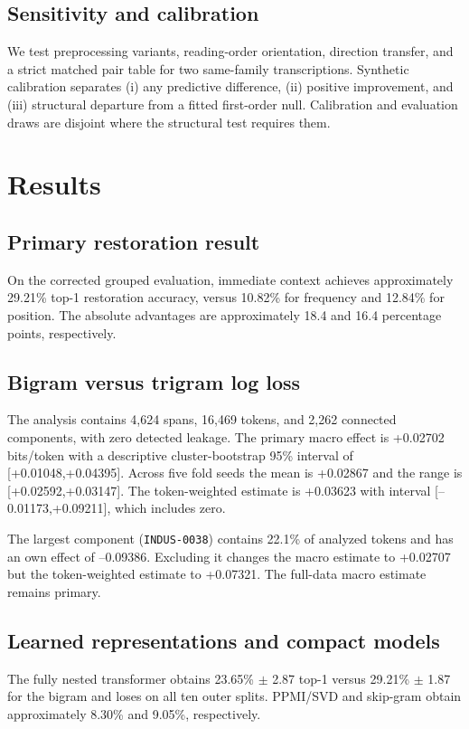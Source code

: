 \documentclass[11pt]{article}
\begin{document}
\subsection{Sensitivity and calibration}
We test preprocessing variants, reading-order orientation, direction transfer, and a strict matched pair table for two same-family transcriptions. Synthetic calibration separates (i) any predictive difference, (ii) positive improvement, and (iii) structural departure from a fitted first-order null. Calibration and evaluation draws are disjoint where the structural test requires them.

\section{Results}
\subsection{Primary restoration result}
On the corrected grouped evaluation, immediate context achieves approximately 29.21\% top-1 restoration accuracy, versus 10.82\% for frequency and 12.84\% for position. The absolute advantages are approximately 18.4 and 16.4 percentage points, respectively.

\subsection{Bigram versus trigram log loss}
The analysis contains 4,624 spans, 16,469 tokens, and 2,262 connected components, with zero detected leakage. The primary macro effect is +0.02702 bits/token with a descriptive cluster-bootstrap 95\% interval of [+0.01048,+0.04395]. Across five fold seeds the mean is +0.02867 and the range is [+0.02592,+0.03147]. The token-weighted estimate is +0.03623 with interval [--0.01173,+0.09211], which includes zero.

The largest component (\texttt{INDUS-0038}) contains 22.1\% of analyzed tokens and has an own effect of --0.09386. Excluding it changes the macro estimate to +0.02707 but the token-weighted estimate to +0.07321. The full-data macro estimate remains primary.

\subsection{Learned representations and compact models}
The fully nested transformer obtains 23.65\% $\pm$ 2.87 top-1 versus 29.21\% $\pm$ 1.87 for the bigram and loses on all ten outer splits. PPMI/SVD and skip-gram obtain approximately 8.30\% and 9.05\%, respectively.
\end{document}
